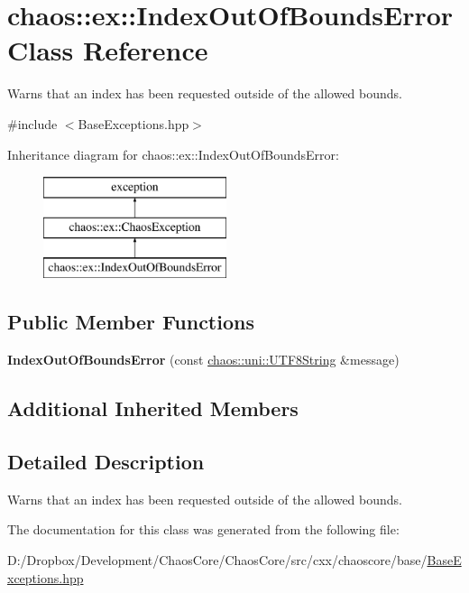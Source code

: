 \hypertarget{classchaos_1_1ex_1_1_index_out_of_bounds_error}{}\section{chaos\+:\+:ex\+:\+:Index\+Out\+Of\+Bounds\+Error Class Reference}
\label{classchaos_1_1ex_1_1_index_out_of_bounds_error}


Warns that an index has been requested outside of the allowed bounds.  




{\ttfamily \#include $<$Base\+Exceptions.\+hpp$>$}

Inheritance diagram for chaos\+:\+:ex\+:\+:Index\+Out\+Of\+Bounds\+Error\+:\begin{figure}[H]
\begin{center}
\leavevmode
\includegraphics[height=3.000000cm]{classchaos_1_1ex_1_1_index_out_of_bounds_error}
\end{center}
\end{figure}
\subsection*{Public Member Functions}
\begin{DoxyCompactItemize}
\item 
\hypertarget{classchaos_1_1ex_1_1_index_out_of_bounds_error_a1af2cf3f2449988f9780d7205c63062b}{}{\bfseries Index\+Out\+Of\+Bounds\+Error} (const \hyperlink{classchaos_1_1uni_1_1_u_t_f8_string}{chaos\+::uni\+::\+U\+T\+F8\+String} \&message)\label{classchaos_1_1ex_1_1_index_out_of_bounds_error_a1af2cf3f2449988f9780d7205c63062b}

\end{DoxyCompactItemize}
\subsection*{Additional Inherited Members}


\subsection{Detailed Description}
Warns that an index has been requested outside of the allowed bounds. 

The documentation for this class was generated from the following file\+:\begin{DoxyCompactItemize}
\item 
D\+:/\+Dropbox/\+Development/\+Chaos\+Core/\+Chaos\+Core/src/cxx/chaoscore/base/\hyperlink{_base_exceptions_8hpp}{Base\+Exceptions.\+hpp}\end{DoxyCompactItemize}
